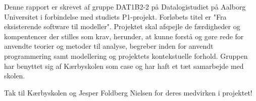 Denne rapport er skrevet af gruppe DAT1B2-2 på Datalogistudiet på Aalborg Universitet i forbindelse med studiets P1-projekt. Forløbets titel er "Fra eksisterende software til modeller". Projektet skal afspejle de færdigheder og kompentencer der stilles som krav, herunder, at kunne forstå og gøre rede for anvendte teorier og metoder til analyse, begreber inden for anvendt programmering samt modellering og projektets kontekstuelle forhold. Gruppen har benyttet sig af Kærbyskolen som case og har haft et tæt samarbejde med skolen.

Tak til Kærbyskolen og Jesper Foldberg Nielsen for deres medvirken i projektet!